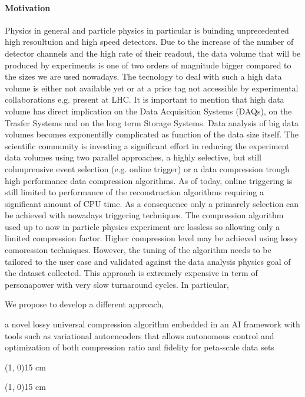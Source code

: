 \paragraph{Motivation}

Physics in general and particle physics in particular is buinding unprecedented high resoultuion and high speed detectors. 
Due to the increase of the number of detector channels and the high rate of their readout, the data volume that will be produced by experiments is one of two orders of magnitude bigger compared to the sizes we are used nowadays. The tecnology to deal with such a high data volume is either not available yet or at a price tag not accessible by experimental collaborations e.g. present at LHC. It is important to mention that high data volume has direct implication on the Data Acquisition Systems (DAQs), on the Trasfer Systems and on the long term Storage Systems. Data analysis of big data volumes becomes exponentilly complicated as function of the data size itself. The scientific community is investing a significant effort in reducing the experiment data volumes using two parallel approaches, a highly selective, but still cohmprensive event selection (e.g. online trigger) or a data compression trough high performance data compression algorithms. 
As of today, online triggering is still limited to performance of the reconstruction algorithms requiring a significant amount of CPU time. As a consequence only a primarely selection can be achieved with nowadays triggering techniques. The compression algorithm used up to now in particle physics experiment are lossless so allowing only a limited compression factor. Higher compression level may be achieved using lossy comoression techniques. However, the tuning of the algorithm needs to be tailored to the user case and validated against the data analysis physics goal of the dataset collected. This approach is extremely expensive in term of personapower with very slow turnaround cycles. In particular,  

We propose to develop a different  approach,



a novel lossy universal compression algorithm embedded in an AI framework with tools such as variational autoencoders that allows autonomous control and optimization of both compression ratio and fidelity for peta-scale data sets



\line(1, 0){15 cm}

\line(1, 0){15 cm}

